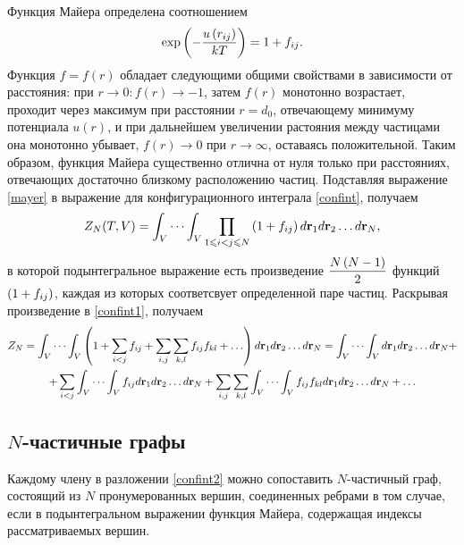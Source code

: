Функция Майера определена соотношением
\vverh
\begin{gather}
	\exp \left( - \frac{u \left( r_{ij} \right)}{kT} \right) = 1 + f_{ij} . \label{mayer}
\end{gather}
Функция $f = f(r)$ обладает следующими общими свойствами в зависимости от расстояния: при $r \longrightarrow 0: f(r) \longrightarrow -1$, затем $f(r)$ монотонно возрастает, проходит через максимум при расстоянии $r = d_0$, отвечающему минимуму потенциала $u(r)$, и при дальнейшем увеличении растояния между частицами она монотонно убывает, $f(r) \longrightarrow 0$ при $r \longrightarrow \infty$, оставаясь положительной. Таким образом, функция Майера существенно отлична от нуля только при расстояниях, отвечающих достаточно близкому расположению частиц. Подставляя выражение \eqref{mayer} в выражение для конфигурационного интеграла \eqref{confint}, получаем
\vverh
\begin{gather}
	Z_N (T, V) = \int_V \cdots \int_V \prod_{1 \leqslant i < j \leqslant N} \left( 1 + f_{ij} \right) d \mathbf{r}_1 d \mathbf{r}_2 \dots d \mathbf{r}_N , \label{confint1}
\end{gather}
в которой подынтегральное выражение есть произведение $\displaystyle\frac{N \left( N - 1 \right)}{2}$ функций $\left( 1 + f_{ij} \right)$, каждая из которых соответсвует определенной паре частиц. Раскрывая произведение в \eqref{confint1}, получаем
\vverh
\begin{gather}
	Z_N = \int_V \cdots \int_V \lb 1 + \sum_{i < j} f_{ij} + \sum_{i, j} \sum_{k,l} f_{ij} f_{kl} + \dots \rb d \mathbf{r}_1 d \mathbf{r}_2 \dots d \mathbf{r}_N = \int_V \cdots \int_V d \mathbf{r}_1 d \mathbf{r}_2 \dots d \mathbf{r}_N + \notag \\ 
	+ \sum_{i < j} \int_V \cdots \int_V f_{ij} d \mathbf{r}_1 d \mathbf{r}_2 \dots d \mathbf{r}_N + \sum_{i, j} \sum_{k, l} \int_V \cdots \int_V f_{ij} f_{kl} d \mathbf{r}_1 d \mathbf{r}_2 \dots d \mathbf{r}_N + \dots \label{confint2}  
\end{gather}

\subsection{$N$-частичные графы \cite{mayer}}
Каждому члену в разложении \eqref{confint2} можно сопоставить $N$-частичный граф, состоящий из $N$ пронумерованных вершин, соединенных ребрами в том случае, если в подынтегральном выражении функция Майера, содержащая индексы рассматриваемых вершин.

